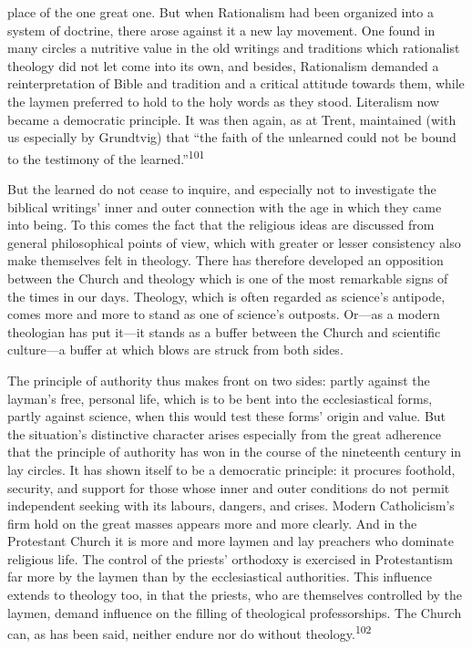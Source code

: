 \documentclass[12pt,a4paper]{book}
\newcommand{\opage}[1]{\marginnote{\footnotesize\textit{[#1]}}}
\begin{document}
place of the one great one. But when Rationalism had been organized into a system of doctrine, there arose
against it a new lay movement. One found in many circles a nutritive value in the old writings and traditions
which rationalist theology did not let come into its own, and besides, Rationalism demanded a reinterpretation
of Bible and tradition and a critical attitude towards them, while the laymen preferred to hold to the holy
words as they stood. Literalism now became a democratic principle. It was then again, as at Trent, maintained
(with us 
\opage{207}especially by Grundtvig) that ``the faith of the unlearned could not be bound to the testimony of the
learned.''\textsuperscript{101}

But the learned do not cease to inquire, and especially not to investigate the biblical writings' inner and
outer connection with the age in which they came into being. To this comes the fact that the religious ideas
are discussed from general philosophical points of view, which with greater or lesser consistency also make
themselves felt in theology. There has therefore developed an opposition between the Church and theology which
is one of the most remarkable signs of the times in our days. Theology, which is often regarded as science's
antipode, comes more and more to stand as one of science's outposts. Or---as a modern theologian has put
it---it stands as a buffer between the Church and scientific culture---a buffer at which blows are struck from
both sides.

The principle of authority thus makes front on two sides: partly against the layman's free, personal life, which
is to be bent into the ecclesiastical forms, partly against science, when this would test these forms' origin
and value. But the situation's distinctive character arises especially from the great adherence that the
principle of authority has won in the course of the nineteenth century in lay circles. It has shown itself to be
a democratic principle: it procures foothold, security, and support for those whose inner and outer conditions do
not permit independent seeking with its labours, dangers, and crises. Modern Catholicism's firm hold on the great
masses appears more and more clearly. And in the Protestant Church it is more and more laymen and lay preachers
who dominate religious life. The control of the priests' orthodoxy is exercised in Protestantism far more by the
laymen than by the ecclesiastical authorities. This influence extends to theology too, in that the priests, who
are themselves controlled by the laymen, demand influence on the filling of theological professorships. The
Church can, as has been said, neither endure nor do without theology.\textsuperscript{102}
\end{document}
